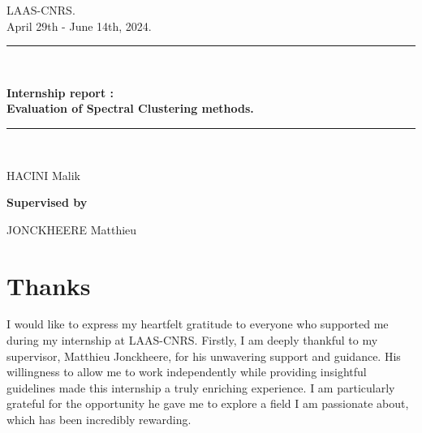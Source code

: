 \documentclass[a4paper,12pt]{article}
\date{June 7, 2024.}
\theoremstyle{definition}
\theoremstyle{plain}
\begin{document}
\BgThispage
\begin{titlepage}
	\centering
	\vspace*{3cm}
	{\large LAAS-CNRS.\\
		April 29th - June 14th, 2024.
		\par}
	\rule{0.6\textwidth}{2pt}\\
	{\huge\bfseries Internship report : \\ Evaluation of Spectral Clustering methods. \\\par}
	\rule{0.6\textwidth}{2pt}\\
	\vspace{2cm}
	{\large
		HACINI Malik
		\par }
	\vspace{1cm}
	{\Large\bfseries Supervised by\par} \:
	{\large JONCKHEERE Matthieu\par}
	
\end{titlepage}

\begin{abstract}
	During my internship at LAAS-CNRS in Toulouse, I focused on exploring and implementing Spectral Clustering algorithms. This report begins with an introduction to the laboratory and outlines the objectives of my internship. I then delve into the technical aspects, starting with an overview of the fundamental theory behind Spectral Clustering. Following this, I describe my implementation of the algorithm in Python and detail the experiments conducted on synthetic datasets to evaluate its performance.
	
	The report further introduces Generalized Spectral Clustering (GSC), a novel framework developed at LAAS. I explain the theoretical ideas and improvements offered by GSC over traditional Spectral Clustering methods. To test and demonstrate the efficacy of GSC, I present experiments performed on both synthetic and real-life datasets.
	
	Overall, this report provides a comprehensive analysis of Spectral Clustering techniques, from basic theory to practical implementation and experimentation, culminating in an exploration of the advanced Generalized Spectral Clustering framework.
	

\end{abstract}
\newpage
\section*{Thanks}
I would like to express my heartfelt gratitude to everyone who supported me during my internship at LAAS-CNRS. Firstly, I am deeply thankful to my supervisor, Matthieu Jonckheere, for his unwavering support and guidance. His willingness to allow me to work independently while providing insightful guidelines made this internship a truly enriching experience. I am particularly grateful for the opportunity he gave me to explore a field I am passionate about, which has been incredibly rewarding.
\end{document}

